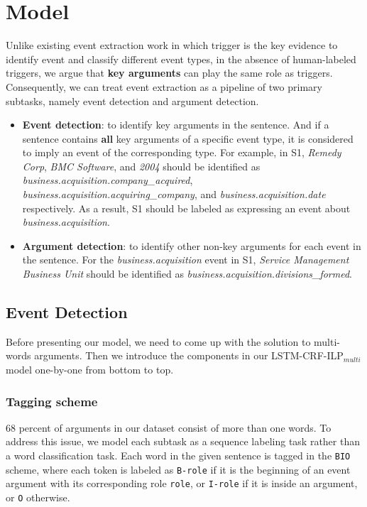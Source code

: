 \documentclass{article}
\begin{document}
\section{Model}
Unlike existing event extraction work in which trigger is the key evidence to identify event and classify different event types, in the absence of human-labeled triggers, we argue that \textbf{key arguments} can play the same role as triggers. Consequently, we can treat event extraction as a pipeline of two primary subtasks, namely event detection and argument detection.
\begin{itemize}
	\item \textbf{Event detection}: to identify key arguments in the sentence. And if a sentence contains \textbf{all} key arguments of a specific event type, it is considered to imply an event of the corresponding type. For example, in S1, \emph{Remedy Corp}, \emph{BMC Software}, and \emph{2004} should be identified as \emph{business.acquisition.company\_acquired}, \emph{business.acquisition.acquiring\_company}, and \emph{business.acquisition.date} respectively. As a result, S1 should be labeled as expressing an event about \emph{business.acquisition}.
	\item \textbf{Argument detection}: to identify other non-key arguments for each event in the sentence. For the \emph{business.acquisition} event in S1, \emph{Service Management Business Unit} should be identified as \emph{business.acquisition.divisions\_formed}.
\end{itemize}

\subsection{Event Detection \label{evede}}
Before presenting our model, we need to come up with the solution to multi-words arguments. Then we introduce the components in our LSTM-CRF-ILP$_{multi}$ model one-by-one from bottom to top.

\subsubsection{Tagging scheme}
68 percent of arguments in our dataset consist of more than one words. To address this issue, we model each subtask as a sequence labeling task rather than a word classification task. Each word in the given sentence is tagged in the \texttt{BIO} scheme, where each token is labeled as \texttt{B-role} if it is the beginning of an event argument with its corresponding role \texttt{role}, or \texttt{I-role} if it is inside an argument, or \texttt{O} otherwise. 
\end{document}
